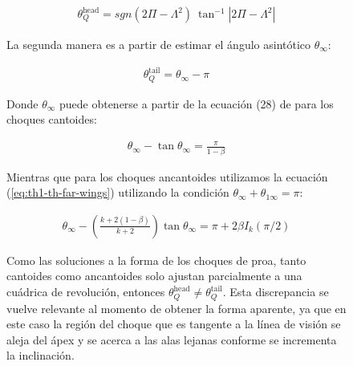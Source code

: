 \begin{figure}
\begin{align}
  \theta^{\mathrm{head}}_Q = sgn\left(2\Pi - \Lambda^2\right)~\tan^{-1}\left|2\Pi-\Lambda^2\right|
\end{align}

La segunda manera es a partir de estimar el ángulo asintótico $\theta_\infty$:

\begin{align}
  \theta^{\mathrm{tail}}_Q = \theta_\infty - \pi \label{eq:th-inf-tail}
\end{align}

Donde $\theta_\infty$ puede obtenerse a partir de la ecuación (28) de \CRW{} para los choques cantoides:

\begin{align}
  \theta_\infty - \tan\theta_\infty = \frac{\pi}{1-\beta}
\end{align}

Mientras que para los choques ancantoides utilizamos la ecuación (\ref{eq:th1-th-far-wings}) utilizando la condición $\theta_\infty + \theta_{1\infty} = \pi$:

\begin{align}
  \theta_\infty - \left(\frac{k+2(1-\beta)}{k+2}\right)\tan\theta_\infty = \pi + 2\beta I_k(\pi/2)
\end{align}

Como las soluciones a la forma de los choques de proa, tanto cantoides como ancantoides solo ajustan parcialmente a una cuádrica de revolución, entonces $\theta^{\mathrm{head}}_Q \neq \theta^{\mathrm{tail}}_Q$. Esta discrepancia se vuelve relevante al momento de obtener la forma aparente, ya que en este caso la región del choque que es tangente a la línea de visión se aleja del ápex y se acerca a las alas lejanas conforme se incrementa la inclinación.


\end{figure}
